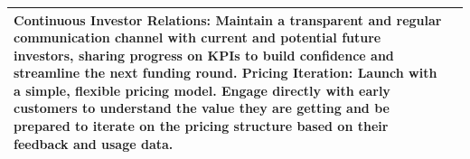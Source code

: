 \documentclass[11pt, a4paper, oneside]{article}
\begin{document}
\begin{table}[H]
\begin{tabularx}{\textwidth}{@{}lL@{}}
\textbf{Continuous Investor Relations:} Maintain a transparent and regular communication channel with current and potential future investors, sharing progress on KPIs to build confidence and streamline the next funding round. \newline\newline
\textbf{Pricing Iteration:} Launch with a simple, flexible pricing model. Engage directly with early customers to understand the value they are getting and be prepared to iterate on the pricing structure based on their feedback and usage data. \\
\bottomrule
\end{tabularx}
\end{table}


\newpage
    
    

\end{document}
